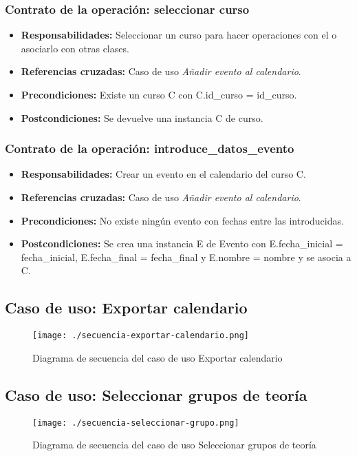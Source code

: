 \subsubsection{Contrato de la operación: seleccionar curso}
\begin{itemize}
\item {\bf Responsabilidades:} Seleccionar un curso para hacer operaciones con el o asociarlo con otras clases.
\item {\bf Referencias cruzadas:} Caso de uso {\em Añadir evento al calendario}.
\item {\bf Precondiciones:} Existe un curso C con C.id\_curso = id\_curso.
\item {\bf Postcondiciones:} Se devuelve una instancia C de curso.
\end{itemize}

\subsubsection{Contrato de la operación: introduce\_datos\_evento}
\begin{itemize}
\item {\bf Responsabilidades:} Crear un evento en el calendario del curso C.
\item {\bf Referencias cruzadas:} Caso de uso {\em Añadir evento al calendario}.
\item {\bf Precondiciones:} No existe ningún evento con fechas entre las introducidas.
\item {\bf Postcondiciones:} Se crea una instancia E de Evento con E.fecha\_inicial = fecha\_inicial, E.fecha\_final = fecha\_final y E.nombre = nombre y se asocia a C.
\end{itemize}

\subsection{Caso de uso: Exportar calendario}
\begin{figure}[H] 
  \label{comportamiento-exportar-calendario} 
	\begin{center}
    \texttt{[image: ./secuencia-exportar-calendario.png]}
  \end{center}
\caption{Diagrama de secuencia del caso de uso Exportar calendario}
\end{figure}


\subsection{Caso de uso: Seleccionar grupos de teoría}
\begin{figure}[H] 
  \label{comportamiento-seleccionar-grupos} 
	\begin{center}
    \texttt{[image: ./secuencia-seleccionar-grupo.png]}
  \end{center}
\caption{Diagrama de secuencia del caso de uso Seleccionar grupos de teoría}
\end{figure}

